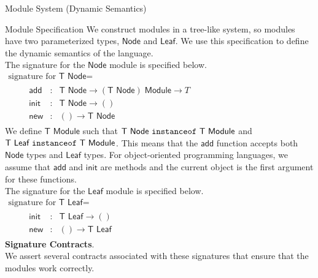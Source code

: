 \documentclass[11pt]{article}
\begin{document}
\begin{section}{Module System (Dynamic Semantics)}
\begin{subsection}{Module Specification}
We construct modules in a tree-like system, so modules have two parameterized types, $\textsf{Node}$ and $\textsf{Leaf}$. We use this specification to define the dynamic semantics of the language.\\

The signature for the $\textsf{Node}$ module is specified below. \\

\qquad $\begin{array}{l}
\mbox{signature for }\textsf{T Node} = \\
\qquad  \begin{array}{lcl}
\textsf{add} & : & \textsf{T Node} \rightarrow (\textsf{T Node})\; \textsf{Module} \rightarrow T\\
\textsf{init} & : & \textsf{T Node} \rightarrow ()\\
\textsf{new} & : & () \rightarrow \textsf{T Node}
\end{array}
\end{array}$\\

We define $\textsf{T Module}$ such that $\textsf{T Node }\verb|instanceof|\textsf{ T Module}$ and \\
$\textsf{T Leaf }\verb|instanceof|\textsf{ T Module}$. This means that the $\textsf{add}$ function accepts
both $\textsf{Node}$ types and $\textsf{Leaf}$ types. For object-oriented programming languages, we assume that $\textsf{add}$ and $\textsf{init}$ are methods and the current object is the first argument for these functions.\\

The signature for the $\textsf{Leaf}$ module is specified below. \\

\qquad $\begin{array}{l}
\mbox{signature for }\textsf{T Leaf} = \\
\qquad  \begin{array}{lcl}
\textsf{init} & : & \textsf{T Leaf} \rightarrow ()\\
\textsf{new} & : & () \rightarrow \textsf{T Leaf}
\end{array}
\end{array}$\\

\textbf{Signature Contracts}.\medskip\\
We assert several contracts associated with these signatures that ensure that the modules work correctly. \\


\end{subsection}
\end{section}
\end{document}
